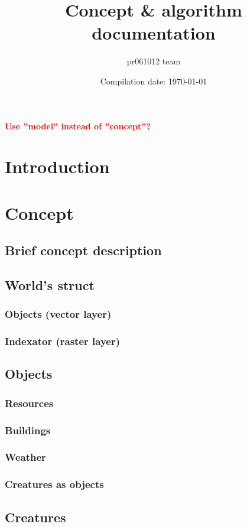 \documentclass[12pt]{article}
\title{Concept \& algorithm documentation}
\author{pr061012 team}
\date{Compilation date: \today}
\newcommand{\todo}[1]
{
    \marginpar
    {
        \textbf{\small{\textcolor{red}{#1}}}
    }
}
\begin{document}
    \maketitle

	\todo{Use ''model'' instead of ''concept''?}

	\section*{Introduction}

	\section{Concept}
		\subsection{Brief concept description}
		\subsection{World's struct}
			\subsubsection{Objects (vector layer)}
			\subsubsection{Indexator (raster layer)}
		\subsection{Objects}
			\subsubsection{Resources}
			\subsubsection{Buildings}
			\subsubsection{Weather}
			\subsubsection{Creatures as objects}
		\subsection{Creatures}
\end{document}
